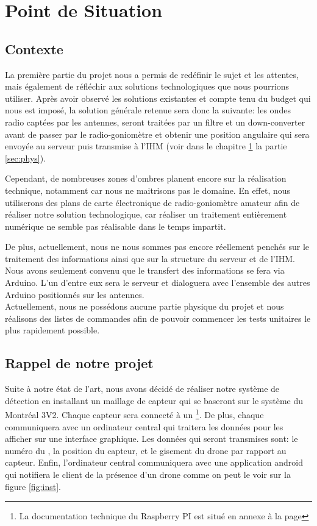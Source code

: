 
\chapter{Point de Situation}
\label{chap:choix}

\section{Contexte}
La première partie du projet nous a permis de redéfinir le sujet et les attentes, mais également de réfléchir aux solutions technologiques que nous pourrions utiliser. Après avoir observé les solutions existantes et compte tenu du budget qui nous est imposé, la solution générale retenue sera donc la suivante: les ondes radio captées par les antennes, seront traitées par un filtre et un down-converter avant de passer par le radio-goniomètre et obtenir une position angulaire qui sera envoyée au serveur puis transmise à l’IHM (voir dans le chapitre \ref{chap:choix} la partie \ref{sec:phys}).

Cependant, de nombreuses zones d’ombres planent encore sur la réalisation technique, notamment car nous ne maitrisons pas le domaine. En effet, nous utiliserons des plans de carte électronique de radio-goniomètre amateur afin de réaliser notre solution technologique, car réaliser un traitement entièrement numérique ne semble pas réalisable dans le temps impartit. 

De plus, actuellement, nous ne nous sommes pas encore réellement penchés sur le traitement des informations ainsi que sur la structure du serveur et de l’IHM. Nous avons seulement convenu que le transfert des informations se fera via Arduino. L’un d’entre eux sera le serveur et dialoguera avec l’ensemble des autres Arduino positionnés sur les antennes.~\\


Actuellement, nous ne possédons aucune partie physique du projet et nous réalisons des listes de commandes afin de pouvoir commencer les tests unitaires le plus rapidement possible.

\section{Rappel de notre projet}

Suite à notre état de l'art, nous avons décidé de réaliser notre système de détection en installant un maillage de capteur qui se baseront sur le système du Montréal 3V2. Chaque capteur sera connecté à un  \footnote{La documentation technique du Raspberry PI est situé en annexe à la page \pageref{annexe:rpi}}. De plus, chaque \rpi communiquera avec un ordinateur central qui traitera les données pour les afficher sur une interface graphique. Les données qui seront transmises sont: le numéro du \rpi, la position du capteur, et le gisement du drone par rapport au capteur. Enfin, l'ordinateur central communiquera avec une application android qui notifiera le client de la présence d'un drone comme on peut le voir sur la figure \ref{fig:inst}.
~\\

